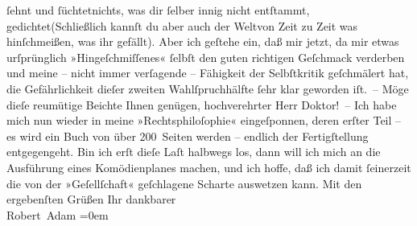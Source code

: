 \begin{ledgroupsized}[t]{13cm}
                     ſehnt und ſüchtet\newverse{}nichts, was dir ſelber innig
                     nicht entſtammt, gedichtet\newverse{}(Schließlich kannſt du aber auch
                     der Welt\newverse{}von Zeit zu Zeit was
                     hinſchmeißen, was ihr gefällt).\stanzaend{}\pstart
           Aber ich geſtehe ein, daß mir jetzt, da mir etwas urſprünglich »Hingeſchmiſſenes«
               ſelbſt den guten richtigen Geſchmack verderben und meine – nicht immer verſagende –
               Fähigkeit der Selbſtkritik geſchmälert hat, die Gefährlichkeit dieſer zweiten
               Wahlſpruchhälfte ſehr klar geworden iſt. –\pend
           \pstart
           Möge dieſe reumütige Beichte Ihnen genügen, hochverehrter Herr Doktor! –\pend
           \pstart
           Ich habe mich nun wieder in meine »Rechtsphiloſophie« eingeſponnen, deren erſter Teil – es wird ein Buch von
               über 200 Seiten werden – endlich der Fertigſtellung entgegengeht. Bin ich erſt dieſe
               Laſt halbwegs los, dann will ich mich an die Ausführung eines Komödienplanes machen,
               und ich hoffe, daß ich damit ſeinerzeit die von der »Geſellſchaft« geſchlagene Scharte auswetzen kann.\pend
           \pstart
           Mit den ergebenſten Grüßen Ihr\pend
           \pstart
           dankbarer{\\[\baselineskip]}\spacefill\mbox{Robert Adam}\pend
           \leftskip=0em{}
         
         \endnumbering{}\end{ledgroupsized}  \newcommand{\dateiname}{L02215}\newcommand{\titel}{Robert Adam an Arthur Schnitzler, 16. 7. 1915}\newcommand{\editorInnen}{Martin Anton Müller und Gerd-Hermann Susen}
      